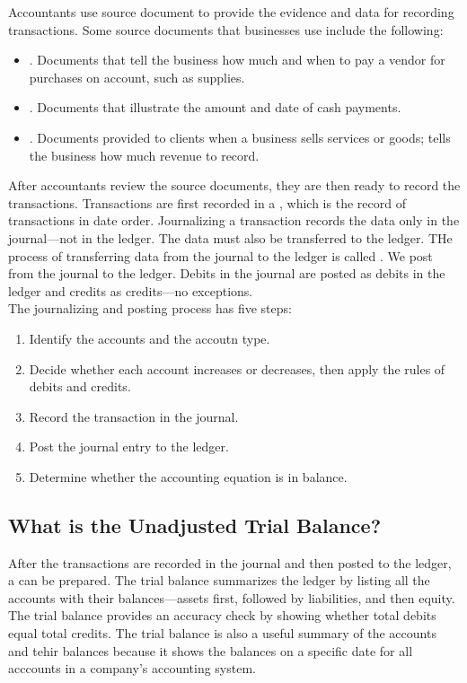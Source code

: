\documentclass{article}
\begin{document}
Accountants use source document to provide the evidence and data for recording transactions. Some source documents that businesses use include the following: 
\begin{itemize}
  \item {}. Documents that tell the business how much and when to pay a vendor for purchases on account, such as supplies. 
  \item {}. Documents that illustrate the amount and date of cash payments. 
  \item {}. Documents provided to clients when a business sells services or goods; tells the business how much revenue to record. 
\end{itemize}
After accountants review the source documents, they are then ready to record the transactions. Transactions are first recorded in a , which is the record of transactions in date order. Journalizing a transaction records the data only in the journal---not in the ledger. The data must also be transferred to the ledger. THe process of transferring data from the journal to the ledger is called . We post from the journal to the ledger. Debits in the journal are posted as debits in the ledger and credits as credits---no exceptions. \\ 

The journalizing and posting process has five steps: 
\begin{enumerate}
  \item Identify the accounts and the accoutn type. 
  \item Decide whether each account increases or decreases, then apply the rules of debits and credits. 
  \item Record the transaction in the journal. 
  \item Post the journal entry to the ledger. 
  \item Determine whether the accounting equation is in balance. 
\end{enumerate}

\subsection{What is the Unadjusted Trial Balance?}

After the transactions are recorded in the journal and then posted to the ledger, a  can be prepared. The trial balance summarizes the ledger by listing all the accounts with their balances---assets first, followed by liabilities, and then equity. The trial balance provides an accuracy check by showing whether total debits equal total credits. The trial balance is also a useful summary of the accounts and tehir balances because it shows the balances on a specific date for all acccounts in a company's accounting system. 
\end{document}
